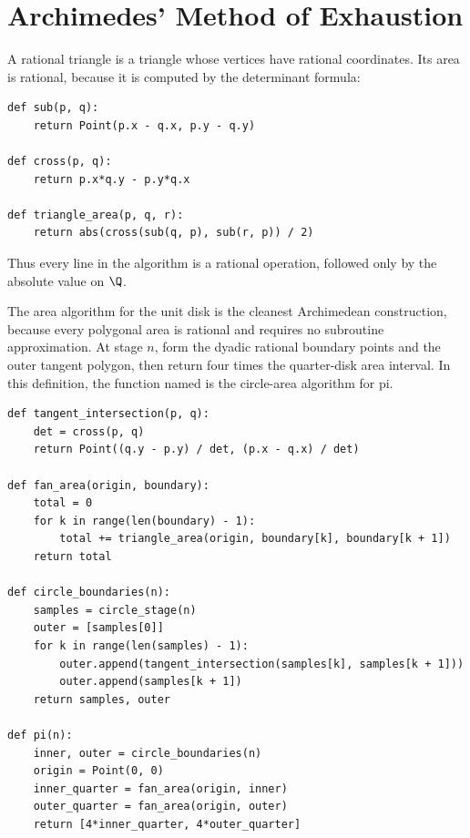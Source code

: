 \section{Archimedes' Method of Exhaustion}

\begin{definition}\label{def:rational-triangle-area}
A rational triangle is a triangle whose vertices have rational coordinates.
Its area is rational, because it is computed by the determinant formula:
\begin{verbatim}
def sub(p, q):
    return Point(p.x - q.x, p.y - q.y)

def cross(p, q):
    return p.x*q.y - p.y*q.x

def triangle_area(p, q, r):
    return abs(cross(sub(q, p), sub(r, p)) / 2)
\end{verbatim}
Thus every line in the algorithm is a rational operation, followed only by
the absolute value on \(\Q\).
\end{definition}

\begin{definition}\label{def:circle-area-stage-algorithm}
The area algorithm for the unit disk is the cleanest Archimedean
construction, because every polygonal area is rational and requires no
subroutine approximation.  At stage \(n\), form the dyadic rational boundary
points and the outer tangent polygon, then return four times the quarter-disk
area interval.  In this definition, the function named  is the
circle-area algorithm for pi.
\begin{verbatim}
def tangent_intersection(p, q):
    det = cross(p, q)
    return Point((q.y - p.y) / det, (p.x - q.x) / det)

def fan_area(origin, boundary):
    total = 0
    for k in range(len(boundary) - 1):
        total += triangle_area(origin, boundary[k], boundary[k + 1])
    return total

def circle_boundaries(n):
    samples = circle_stage(n)
    outer = [samples[0]]
    for k in range(len(samples) - 1):
        outer.append(tangent_intersection(samples[k], samples[k + 1]))
        outer.append(samples[k + 1])
    return samples, outer

def pi(n):
    inner, outer = circle_boundaries(n)
    origin = Point(0, 0)
    inner_quarter = fan_area(origin, inner)
    outer_quarter = fan_area(origin, outer)
    return [4*inner_quarter, 4*outer_quarter]
\end{verbatim}
\end{definition}

